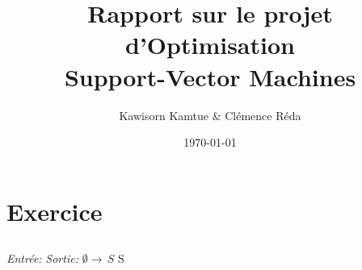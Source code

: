 \documentclass{article}
\title{Rapport sur le projet d'Optimisation\\Support-Vector Machines}
\author{Kawisorn Kamtue \& Clémence Réda}
\date{\today}
\begin{document}
\section{Exercice}

\subsection{}

\begin{algorithm}
\caption{}
\begin{algorithmic}
\STATE \textit{Entrée:} 
\STATE \textit{Sortie:} 
\STATE $\emptyset \to\, S$
\RETURN S
\end{algorithmic}
\end{algorithm}
\end{document}
